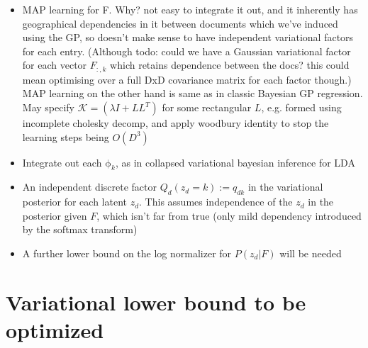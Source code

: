 \documentclass{report}
\renewcommand{\v}[1]{\boldsymbol{\mathrm{#1}}}
\begin{document}
\begin{itemize}
  \item MAP learning for F. Why? not easy to integrate it out, and it
    inherently has geographical dependencies in it between documents
    which we've induced using the GP, so doesn't make sense to have
    independent variational factors for each entry. (Although todo:
    could we have a Gaussian variational factor for each vector
    $F_{:,k}$ which retains dependence between the docs? this could
    mean optimising over a full DxD covariance matrix for each factor
    though.) MAP learning on the other hand is same as in classic
    Bayesian GP regression.
    May specify $\mathcal{K} = (\lambda I + LL^T)$ for some
    rectangular $L$, e.g. formed using incomplete cholesky decomp, and
    apply woodbury identity to stop the learning steps being $O(D^3)$
  \item Integrate out each $\v\phi_k$, as in collapsed variational
    bayesian inference for LDA
  \item An independent discrete factor $Q_d(z_d = k) := q_{dk}$ in the variational posterior
    for each latent $z_d$. This assumes independence of the $z_d$ in
    the posterior given $F$, which isn't far from true (only mild
    dependency introduced by the softmax transform)
  \item A further lower bound on the log normalizer for $P(z_d | F)$
    will be needed
\end{itemize}

\section{Variational lower bound to be optimized}
\end{document}
